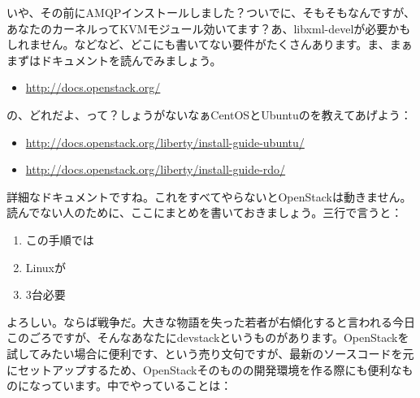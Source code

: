 \documentclass[9pt,b5paper,tombo,openany,dvipdfmx]{jsbook}
\begin{document}
いや、その前にAMQPインストールしました？ついでに、そもそもなんですが、あなたのカーネルってKVMモジュール効いてます？あ、libxml-develが必要かもしれません。などなど、どこにも書いてない要件がたくさんあります。ま、まぁまずはドキュメントを読んでみましょう。

\begin{itemize}
	\item \url{http://docs.openstack.org/}
\end{itemize}

の、どれだよ、って？しょうがないなぁCentOSとUbuntuのを教えてあげよう：

\begin{itemize}
	\item \url{http://docs.openstack.org/liberty/install-guide-ubuntu/}
	\item \url{http://docs.openstack.org/liberty/install-guide-rdo/}
\end{itemize}

詳細なドキュメントですね。これをすべてやらないとOpenStackは動きません。読んでない人のために、ここにまとめを書いておきましょう。三行で言うと：

\begin{enumerate}
	\item この手順では
	\item Linuxが
	\item 3台必要
\end{enumerate}

よろしい。ならば戦争だ。大きな物語を失った若者が右傾化すると言われる今日このごろですが、そんなあなたにdevstackというものがあります。OpenStackを試してみたい場合に便利です、という売り文句ですが、最新のソースコードを元にセットアップするため、OpenStackそのものの開発環境を作る際にも便利なものになっています。中でやっていることは：
\end{document}
